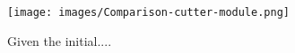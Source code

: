 \begin{figure}[t]
\centering
  \texttt{[image: images/Comparison-cutter-module.png]}
\caption{Given the initial....}
  \label{fig:Comparison-cutter-module}    
\end{figure}